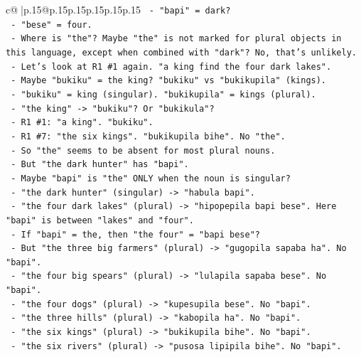\documentclass{article}
\begin{document}
{\begin{supertabular}{c@{$\;$}|p{.15\linewidth}@{}p{.15\linewidth}p{.15\linewidth}p{.15\linewidth}p{.15\linewidth}p{.15\linewidth}}
{{{\texttt{                {-} "bapi" = dark?} \\
\texttt{                {-} "bese" = four.} \\
\texttt{                {-} Where is "the"? Maybe "the" is not marked for plural objects in this language, except when combined with "dark"? No, that's unlikely.} \\
\texttt{                {-} Let's look at R1 \#1 again. "a king find the four dark lakes".} \\
\texttt{                {-} Maybe "bukiku" = the king? "bukiku" vs "bukikupila" (kings).} \\
\texttt{                {-} "bukiku" = king (singular). "bukikupila" = kings (plural).} \\
\texttt{                {-} "the king" {-}> "bukiku"? Or "bukikula"?} \\
\texttt{                {-} R1 \#1: "a king". "bukiku".} \\
\texttt{                {-} R1 \#7: "the six kings". "bukikupila bihe". No "the".} \\
\texttt{                {-} So "the" seems to be absent for most plural nouns.} \\
\texttt{                {-} But "the dark hunter" has "bapi".} \\
\texttt{                {-} Maybe "bapi" is "the" ONLY when the noun is singular?} \\
\texttt{                {-} "the dark hunter" (singular) {-}> "habula bapi".} \\
\texttt{                {-} "the four dark lakes" (plural) {-}> "hipopepila bapi bese". Here "bapi" is between "lakes" and "four".} \\
\texttt{                {-} If "bapi" = the, then "the four" = "bapi bese"?} \\
\texttt{                {-} But "the three big farmers" (plural) {-}> "gugopila sapaba ha". No "bapi".} \\
\texttt{                {-} "the four big spears" (plural) {-}> "lulapila sapaba bese". No "bapi".} \\
\texttt{                {-} "the four dogs" (plural) {-}> "kupesupila bese". No "bapi".} \\
\texttt{                {-} "the three hills" (plural) {-}> "kabopila ha". No "bapi".} \\
\texttt{                {-} "the six kings" (plural) {-}> "bukikupila bihe". No "bapi".} \\
\texttt{                {-} "the six rivers" (plural) {-}> "pusosa lipipila bihe". No "bapi".} \\
}}}
\end{supertabular}}
\end{document}

